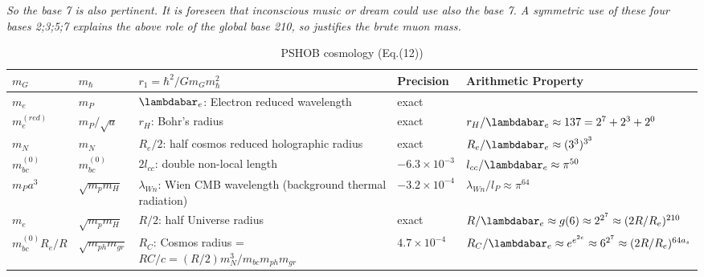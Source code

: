 \documentclass[a4paper,9pt]{article}
\newcounter{col}
\begin{document}

\textit{So the base 7 is also pertinent.  It is foreseen that inconscious music or dream could use also the base 7. A symmetric use of these four bases 2;3;5;7 explains the above role of the global base 210, so justifies the brute muon mass. }

 

 
\begin{table}
\caption[Table \ref{tab:5:table5}: PSHOB Cosmology.]{PSHOB cosmology (Eq.(12))}
\label{tab:5:table5}
  \hskip-2.0cm\begin{tabular}{lllll}
    \toprule
    \cmidrule(r){1-4}
    $m_G$ & $m_{\hbar}$    & $r_1 = \hbar^2/Gm_G m_{\hbar}^2$  & Precision &Arithmetic Property \\
    \midrule
    
    $m_e$ & $m_P $ & $\lambdabar_e$: Electron reduced wavelength   & exact & \\
    
    $m_e^{(red)}$ & $m_P/\sqrt a $ & $r_H$: Bohr's radius   & exact & $ r_H/\lambdabar_e \approx 137 = 2^7+2^3+2^0 $\\
    
    $m_N $ & $m_N$   & $R_e/2$: half cosmos reduced holographic radius  &  exact & $R_e/\lambdabar_e \approx (3^3)^{3^3}$ \\
    $m_{bc}^{(0)} $ & $m_{bc}^{(0)}$   & $2l_{cc}$: double non-local length & $-6.3 \times 10^{-3}$ & $ l_{cc}/\lambdabar_e \approx \pi^{50}$  \\
    $m_Pa^3 $ & $\sqrt {m_pm_H}$  &$\lambda_{Wn}$: Wien CMB wavelength (background thermal radiation) & $-3.2 \times 10^{-4}$ &$\lambda_{Wn}/l_P \approx \pi^{64}$\\
    $m_e $ & $\sqrt {m_pm_H}$   & $R/2$: half Universe radius &exact& $R/\lambdabar_e \approx g(6) \approx 2^{2^7}\approx (2R/R_e)^{210}$   \\
    
    $m_{bc}^{(0)}R_e/R $ & $\sqrt{ m_{ph}m_{gr}}$   & $R_C$: Cosmos radius = $RC/c = (R/2)m_N^3/m_{bc}m_{ph}m_{gr}$ & $4.7 \times 10^{-4} $& $ R_C/\lambdabar_e \approx e^{e^{2e}} \approx 6^{2^7}\approx (2R/R_e)^{64a_s}  $\\
    
  
         
   \bottomrule
  \end{tabular}
\end{table}
\end{document}
